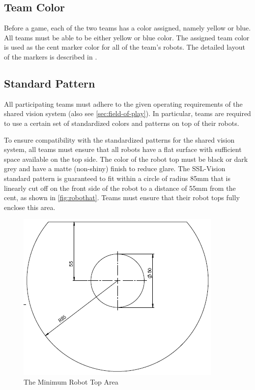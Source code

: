 \subsection{Team Color}
Before a game, each of the two teams has a color assigned, namely yellow or blue.
All teams must be able to be either yellow or blue color.
The assigned team color is used as the cent marker color for all of the team's robots.
The detailed layout of the markers is described in .

\subsection{Standard Pattern}\label{subsec:robotic-equipment-standard-pattern}
All participating teams must adhere to the given operating requirements of the shared vision system (also see \autoref{sec:field-of-play}).
In particular, teams are required to use a certain set of standardized colors and patterns on top of their robots.

To ensure compatibility with the standardized patterns for the shared vision system, all teams must ensure that all robots have a flat surface with sufficient space available on the top side.
The color of the robot top must be black or dark grey and have a matte (non-shiny) finish to reduce glare.
The SSL-Vision standard pattern is guaranteed to fit within a circle of radius 85\added{\,}mm that is linearly cut off on the front side of the robot to a distance of 55\added{\,}mm from the cent, as shown in \autoref{fig:robothat}.
Teams must ensure that their robot tops fully enclose this area.

\begin{figure}[ht] %
	\centering
	\includegraphics[width=0.8\columnwidth]{img/robot_hat.png}
	\caption{The Minimum Robot Top Area}
	\label{fig:robothat}
\end{figure}

